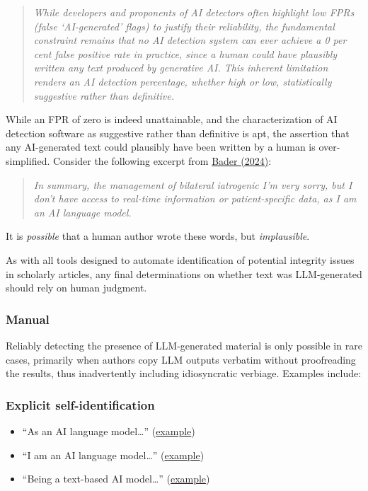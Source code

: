 \documentclass[letterpaper, 12pt]{article}
\begin{document}
\begin{quote}
\textit{While developers and proponents of AI detectors often highlight low FPRs (false `AI-generated' flags) to justify their reliability, the fundamental constraint remains that no AI detection system can ever achieve a 0 per cent false positive rate in practice, since a human could have plausibly written any text produced by generative AI. This inherent limitation renders an AI detection percentage, whether high or low, statistically suggestive rather than definitive.}
\end{quote}

While an FPR of zero is indeed unattainable, and the characterization of AI detection software as suggestive rather than definitive is apt, the assertion that any AI-generated text could plausibly have been written by a human is over-simplified. Consider the following excerpt from \href{https://doi.org/10.1016/j.radcr.2024.05.010}{Bader (2024)}:

\begin{quote}
\textit{In summary, the management of bilateral iatrogenic I'm very sorry, but I don't have access to real-time information or patient-specific data, as I am an AI language model.}
\end{quote}
%

It is \emph{possible} that a human author wrote these words, but \emph{implausible}.

As with all tools designed to automate identification of potential integrity issues in scholarly articles, any final determinations on whether text was LLM-generated should rely on human judgment.

\subsubsection*{Manual}\label{manual}

Reliably detecting the presence of LLM-generated material is only possible in rare
cases, primarily when authors copy LLM outputs verbatim without proofreading the results, thus inadvertently
including idiosyncratic verbiage. Examples include:

\subsubsection*{Explicit self-identification}
\begin{itemize}
    \setlength\itemsep{-0.5em}
    \item ``As an AI language model\ldots'' (\href{https://pubpeer.com/publications/C5DC15FC0BF642C7042F351B98F4B6#1}{example})
    \item ``I am an AI language model\ldots'' (\href{https://pubpeer.com/publications/FEC5A3AD89F1963922C6EB6005FD1B#1}{example})
    \item ``Being a text-based AI model\ldots'' (\href{https://pubpeer.com/publications/FEC5A3AD89F1963922C6EB6005FD1B#2}{example})
\end{itemize}
\end{document}
